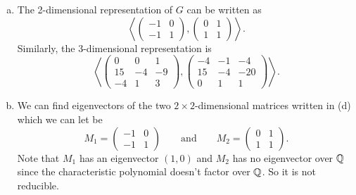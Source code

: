 \documentclass[leqno]{article}
\begin{document}
\begin{solution}
\begin{enumerate}[(a)]
    \item The 2-dimensional representation of $G$ can be written as
    \[
    \left\langle \begin{pmatrix} -1 & 0\\ -1 & 1 \end{pmatrix}, \begin{pmatrix} 0 & 1\\ 1 & 1 \end{pmatrix} \right\rangle.
    \]
    Similarly, the 3-dimensional representation is
    \[
    \left\langle \begin{pmatrix} 0 & 0 & 1 \\ 15 & -4 & -9\\ -4 & 1 & 3\end{pmatrix}, \begin{pmatrix} -4 & -1 & -4 \\ 15 & -4 & -20 \\ 0 & 1 & 1\end{pmatrix}\right\rangle.
    \]
    \item We can find eigenvectors of the two $2\times2$-dimensional matrices written in (d) which we can let be
    \[
    M_1 = \begin{pmatrix} -1 & 0 \\ -1 & 1 \end{pmatrix} \qquad \textrm{and} \qquad M_2 = \begin{pmatrix} 0 & 1 \\ 1 & 1 \end{pmatrix}.
    \]
    Note that $M_1$ has an eigenvector $(1,0)$ and $M_2$ has no eigenvector over $\mathbb{Q}$ since the characteristic polynomial doesn't factor over $\mathbb{Q}$. So it is not reducible.
\end{enumerate}
\end{solution}
\end{document}
